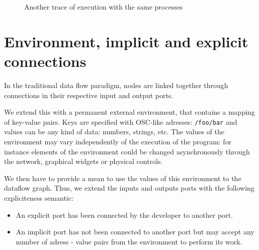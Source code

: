 \documentclass{article}
\begin{document}
    \begin{figure}[h]
        \centering
        \caption{Another trace of execution with the same processes}
        \label{fig.simple-reversed}
    \end{figure}
    
    \section{Environment, implicit and explicit connections}
    In the traditional data flow paradigm, nodes are linked together through connections in their respective input and output ports.
    
    We extend this with a permanent external environment, that contains a mapping of key-value pairs. 
    Keys are specified with OSC-like\cite{osc} adresses: \lstinline|/foo/bar| and values can be any kind of data: numbers, strings, etc. 
    The values of the environment may vary independently of the execution of the program: for instance elements of the environment could be changed asynchronously through the network, graphical widgets or physical controls.
    
    We then have to provide a mean to use the values of this environment to the dataflow graph.
    Thus, we extend the inputs and outputs ports with the following expliciteness semantic: 
    
    \begin{itemize}
        \item An explicit port has been connected by the developer to another port.
        \item An implicit port has not been connected to another port but may accept any number of adress - value pairs from the environment to perform its work.
    \end{itemize}
    
\end{document}
